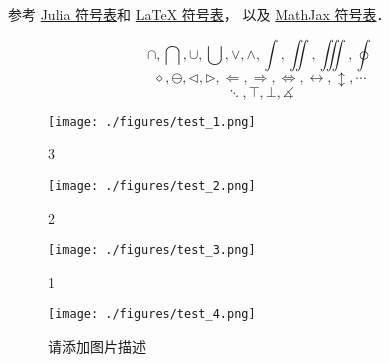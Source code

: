 
参考 \href{https://docs.julialang.org/en/v1/manual/unicode-input/}{Julia 符号表}和 \href{https://oeis.org/wiki/List_of_LaTeX_mathematical_symbols}{LaTeX 符号表}， 以及 \href{http://www.onemathematicalcat.org/MathJaxDocumentation/TeXSyntax.htm#U}{MathJax 符号表}．

\begin{equation}
\cap, \bigcap, \cup, \bigcup, \vee, \wedge, \int, \iint, \iiint, \oint
\end{equation}
\begin{equation}
\diamond, \ominus, \triangleleft, \triangleright, \Longleftarrow, \Longrightarrow, \iff, \leftrightarrow, \updownarrow, \cdots
\end{equation}
\begin{equation}
\ddots, \top, \bot, \measuredangle
\end{equation}

\begin{figure}[ht]
\centering
\texttt{[image: ./figures/test\_1.png]}
\caption{3} \label{test_fig1}
\end{figure}

\begin{figure}[ht]
\centering
\texttt{[image: ./figures/test\_2.png]}
\caption{2} \label{test_fig2}
\end{figure}

\begin{figure}[ht]
\centering
\texttt{[image: ./figures/test\_3.png]}
\caption{1} \label{test_fig3}
\end{figure}

\begin{figure}[ht]
\centering
\texttt{[image: ./figures/test\_4.png]}
\caption{请添加图片描述} \label{test_fig4}
\end{figure}